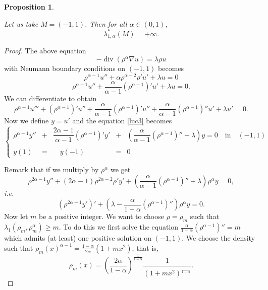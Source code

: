 \documentclass[12pt,reqno]{amsart}		%
\theoremstyle{plain}
\newtheorem{proposition}[thm]{Proposition}
\theoremstyle{definition}
\theoremstyle{remark}
\numberwithin{equation}{section}
\newcommand{\N}{\mathbb{N}}
\renewcommand{\div}{\operatorname{div}}
\begin{document}
\begin{proposition}
\label{minoration_dimension_1}

Let us take $M = (-1,1)$. Then for all $\alpha \in (0,1)$,
\[
\lambda_{1,\alpha}^{*}(M) = +\infty.
\]
\end{proposition}
\begin{proof} %
	
The above equation 
\begin{equation*}
-\div(\rho^{\alpha} \nabla u)=\lambda\rho u
\end{equation*}
with Neumann boundary conditions on $(-1,1)$ becomes
	\[
	\rho^{\alpha - 1}u'' + \alpha \rho^{\alpha - 2}\rho'u' + \lambda u = 0
	\]
	\[
	\rho^{\alpha - 1}u'' + \frac{\alpha}{\alpha-1}\left(\rho^{\alpha-1}\right)'u' + \lambda u = 0.
	\]
	We can differentiate to obtain
	\begin{equation*}
	\label{equation_premiere}
	\rho^{\alpha-1}u'''
	+\left(\rho^{\alpha-1}\right)'u''
	+\dfrac{\alpha}{\alpha-1}\left(\rho^{\alpha-1}\right)'u''
	+\dfrac{\alpha}{\alpha-1}\left(\rho^{\alpha-1}\right)''u'
	+\lambda u' =0.
	\end{equation*}
	Now we define $y=u'$ and the equation \eqref{luc3} becomes
	\[
	\left\{
	\begin{array}{lllll}
	\rho^{\alpha-1}y''
	&+&\dfrac{2\alpha-1}{\alpha-1}\left(\rho^{\alpha-1}\right)'y'
	&+&\left(\dfrac{\alpha}{\alpha-1}\left(\rho^{\alpha-1}\right)''
	+\lambda\right)y=0 \quad\text{in}\quad(-1,1)\\
	\\
	y(1)&=&\quad y(-1)&=& 0 
	\end{array}
	\right.
	\]
	
	Remark that if we multiply by $\rho^{\alpha}$ we get
	\[
	\rho^{2\alpha-1}y''
	+(2\alpha-1)\rho^{2\alpha-2}\rho'y'
	+\left(\dfrac{\alpha}{\alpha-1}\left(\rho^{\alpha-1}\right)''
	+\lambda\right)\rho^{\alpha}y =0,
	\]
	\textit{i.e.}
	\begin{equation}
	\label{eq_intervalle}
	\left(\rho^{2\alpha-1}y'\right)'
	+\left(\lambda-\dfrac{\alpha}{1-\alpha}\left(\rho^{\alpha-1}\right)''\right)\rho^{\alpha}y =0.
	\end{equation}
Now let $m$ be a positive integer. We want to choose $\rho=\rho_m$ such that $\lambda_1\left(\rho_m, \rho_m^{\alpha}\right) \geqslant m$. To do this we first solve the equation $\frac{\alpha}{1-\alpha}\left(\rho^{\alpha-1}\right)'' = m$ which admits (at least) one positive solution on $(-1,1)$. We choose the density such that
$\rho_m(x)^{\alpha-1}
	= \frac{1-\alpha}{2\alpha}\left(1+mx^2\right)$, that is,
	\[
		\rho_m(x)
		= \left(\frac{2\alpha}{1-\alpha}\right)^{\frac{1}{1-\alpha}}\dfrac{1}{\left(1+mx^2\right)^{\frac{1}{1-\alpha}}}.
	\]
	

\end{proof}
\end{document}
